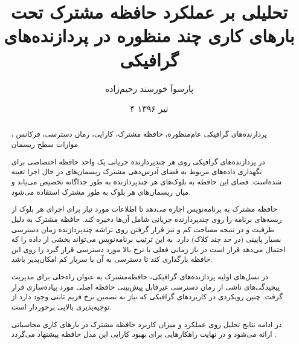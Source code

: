 \documentclass{thesis}
\begin{document}
\date{
۴ تیر ۱۳۹۶
}
\title{
تحلیلی بر عملکرد حافظه مشترک تحت بارهای کاری چند منظوره در پردازنده‌های گرافیکی
}
\author{
پارسوآ خورسند رحیم‌زاده
}
\subject{%
مهندسی نرم‌افزار
}
\frontmatter \makethesistitle \pagestyle{empty} \baselineskip
\begin{abstract}
{%
پردازنده‌های گرافیکی عام‌منظوره، حافظه مشترک، کارایی، زمان دسترسی،
فرکانس ، موازات سطح ریسمان
}
{%
در پردازنده‌های گرافیکی روی هر چند‌پردازنده جریانی
یک واحد حافظه اختصاصی برای نگهداری داده‌های مربوط به فضای آدرس‌دهی مشترک 
ریسمان‌های در حال اجرا تعبیه شده‌است. فضای این حافظه به بلوک‌های هر چندپردازنده
به
طور
جداگانه تخصیص می‌یابد و میان ریسمان‌های
 هر بلوک به طور مشترک استفاده می‌شود.

حافظه مشترک
 به برنامه‌نویس اجازه می‌دهد تا اطلاعات مورد نیاز برای اجرای هر بلوک از
ریسه‌های برنامه را روی چندپردازنده‌ جریانی شامل آن‌ها ذخیره کند. حافظه مشترک به
دلیل ظرفیت و در نتیجه مساحت کم و نیز قرار گرفتن روی تراشه چند‌پردازنده زمان
دسترسی بسیار پایینی (در حد چند کلاک) دارد. به این ترتیب برنامه‌نویس می‌تواند
بخشی از داده را که احتمال می‌دهد قرار است در باز زمانی فعلی با نرخ بالا مورد
دسترسی قرار گیرد را روی این حافظه بارگذاری
  کند تا دسترسی به آن با سربار کم امکان‌پذیر باشد. 
  
  
  در نسل‌های اولیه پردازنده‌های گرافیکی، حافظه‌مشترک به عنوان راه‌حلی برای
مدیریت پیچیدگی‌های ناشی از زمان دسترسی غیر‌قابل پیش‌بینی حافظه‌ اصلی مورد
پیاده‌سازی قرار گرفت. چنین رویکردی در کاربرد‌های گرافیکی که نیاز به تضمین نرخ
فریم
ثابتی وجود دارد از توجیه‌پذیری بالایی برخوردار است.

در ادامه نتایج تحلیل روی عملکرد و میزان کاربرد حافظه مشترک در بارهای کاری
محاسباتی ارائه می‌شود و در نهایت راهکار‌هایی برای بهبود کارایی 
این مدل حافظه پیشنهاد می‌گردد
.
}
\end{abstract}
\end{document}
